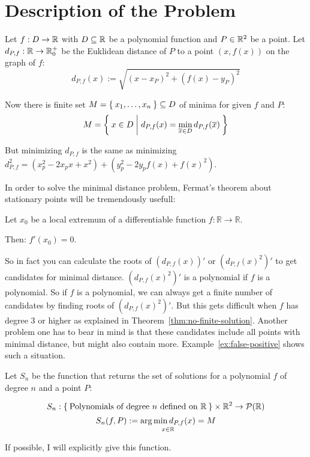 \chapter{Description of the Problem}
Let $f: D \rightarrow \mathbb{R}$ with $D \subseteq \mathbb{R}$ be a polynomial function and $P \in \mathbb{R}^2$
be a point. Let $d_{P,f}: \mathbb{R} \rightarrow \mathbb{R}_0^+$
be the Euklidean distance of $P$ to a point $\left (x, f(x) \right )$
on the graph of $f$:
\[d_{P,f} (x) := \sqrt{(x - x_P)^2 + (f(x) - y_P)^2}\]

Now there is finite set $M = \Set{x_1, \dots, x_n} \subseteq D$ of minima for given $f$ and $P$:
\[M = \Set{x \in D | d_{P,f}(x) = \min_{\overline{x} \in D} d_{P,f}(\overline{x})}\] 

But minimizing $d_{P,f}$ is the same as minimizing 
$d_{P,f}^2 = (x_p^2 - 2x_p x + x^2) + (y_p^2 - 2y_p f(x) + f(x)^2)$.

In order to solve the minimal distance problem, Fermat's theorem 
about stationary points will be tremendously usefull:

\begin{theorem}\label{thm:fermats-theorem}
    Let $x_0$ be a local extremum of a differentiable function $f: \mathbb{R} \rightarrow \mathbb{R}$.

    Then: $f'(x_0) = 0$.
\end{theorem}

So in fact you can calculate the roots of $(d_{P,f}(x))'$ or $(d_{P,f}(x)^2)'$ to get
candidates for minimal distance.
$(d_{P,f}(x)^2)'$ is a polynomial if $f$ is a polynomial. So if $f$ 
is a polynomial, we can always get a finite number of candidates by 
finding roots of $(d_{P,f}(x)^2)'$. But this gets difficult when $f$
has degree 3 or higher as explained in Theorem~\ref{thm:no-finite-solution}.
Another problem one has to bear in mind is that these candidates 
include all points with minimal distance, but might also contain 
more. Example~\ref{ex:false-positive} shows such a situation.

Let $S_n$ be the function that returns the set of solutions for a
polynomial $f$ of degree $n$ and a point $P$:

\[S_n: \Set{\text{Polynomials of degree } n \text{ defined on } \ensuremath{\mathbb{R}}} \times \mathbb{R}^2 \rightarrow \mathcal{P}({\mathbb{R}})\]
\[S_n(f, P) := \underset{x\in\mathbb{R}}{\arg \min d_{P,f}(x)} = M\]

If possible, I will explicitly give this function.
